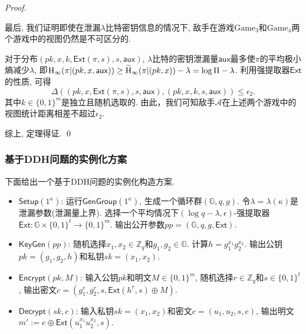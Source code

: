 \begin{proof}
\begin{trivlist}
最后, 我们证明即使在泄漏$\lambda$比特密钥信息的情况下, 敌手在游戏$\text{Game}_3$和$\text{Game}_4$两个游戏中的视图仍然是不可区分的. 

对于分布$(pk, x, k, \mathsf{Ext}(\pi, s), s, \mathsf{aux})$, $\lambda$比特的密钥泄漏量$\mathsf{aux}$最多使$\pi$的平均极小熵减少$\lambda$, 即${\textup{H}}_{\infty}(\pi|(pk, x, \mathsf{aux}))\geq \widetilde
{\textup{H}}_{\infty}(\pi|(pk, x)) - \lambda = \log\Pi - \lambda$. 利用强提取器$\mathsf{Ext}$的性质, 可得
\begin{equation*}
	\Delta((pk, x, \mathsf{Ext}(\pi, s), s, \mathsf{aux}), (pk, x, k, s, \mathsf{aux}))\leq \epsilon_2.
\end{equation*}
其中$k \in \{0, 1\}^m$是独立且随机选取的. 由此，我们可知敌手$\mathcal{A}$在上述两个游戏中的视图统计距离相差不超过$\epsilon_2$.
\end{trivlist}

综上, 定理得证. \qed
\end{proof}

\subsubsection{基于DDH问题的实例化方案}
下面给出一个基于DDH问题的实例化构造方案.
\begin{construction}\label{DDH-NS-PKE}
\begin{itemize}
\item $\mathsf{Setup}(1^\kappa)$:  运行$\mathsf{GenGroup}(1^\kappa)$, 生成一个循环群$(\mathbb{G}, q, g)$. 令$\lambda = \lambda(\kappa)$是泄漏参数(泄漏量上界). 选择一个平均情况下$(\log q-\lambda, \epsilon)$-强提取器$\mathsf{Ext}: \mathbb{G} \times \{0, 1\}^t \rightarrow \{0, 1\}^m$. 输出公开参数$pp = (\mathbb{G}, q, g, \mathsf{Ext})$. 

\item $\mathsf{KeyGen}(pp)$: 随机选择$x_1, x_2 \in \mathbb{Z}_q$和$g_1, g_2 \in \mathbb{G}$. 计算$h=g_1^{x_1}g_2^{x_2}$. 输出公钥$pk = (g_1, g_2, h)$和私钥$sk = (x_1, x_2)$. 
  
\item $\mathsf{Encrypt}(pk, M)$: 输入公钥$pk$和明文$M \in \{0, 1\}^m$, 随机选择$r \in \mathbb{Z}_q$和$s \in \{0, 1\}^t$, 输出密文$c = (g_1^r, g_2^r, s, \mathsf{Ext}(h^r, s) \oplus M)$.

\item $\mathsf{Decrypt}(sk, c)$: 输入私钥$sk = (x_1, x_2)$和密文$c = (u_1, u_2, s, e)$, 输出明文$m':= e \oplus \mathsf{Ext}(u_1^{x_1}u_2^{x_2}, s)$.
\end{itemize}
\end{construction}

